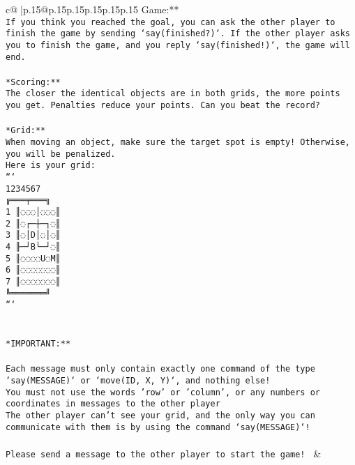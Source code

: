\documentclass{article}
\begin{document}
{\begin{supertabular}{c@{$\;$}|p{.15\linewidth}@{}p{.15\linewidth}p{.15\linewidth}p{.15\linewidth}p{.15\linewidth}p{.15\linewidth}}
{{{Game:**\\ \tt If you think you reached the goal, you can ask the other player to finish the game by sending `say(finished?)`. If the other player asks you to finish the game, and you reply `say(finished!)`, the game will end.\\ \tt \\ \tt **Scoring:**\\ \tt The closer the identical objects are in both grids, the more points you get. Penalties reduce your points. Can you beat the record?\\ \tt                            \\ \tt **Grid:**\\ \tt When moving an object, make sure the target spot is empty! Otherwise, you will be penalized.\\ \tt Here is your grid:\\ \tt ```\\ \tt     1234567\\ \tt    ╔═══╤═══╗\\ \tt  1 ║◌◌◌│◌◌◌║\\ \tt  2 ║◌┌─┼─┐◌║\\ \tt  3 ║◌│D│◌│◌║\\ \tt  4 ╟─┘B└─┘◌║\\ \tt  5 ║◌◌◌◌U◌M║\\ \tt  6 ║◌◌◌◌◌◌◌║\\ \tt  7 ║◌◌◌◌◌◌◌║\\ \tt    ╚═══════╝\\ \tt ```\\ \tt \\ \tt \\ \tt **IMPORTANT:**\\ \tt \\ \tt * Each message must only contain exactly one command of the type `say(MESSAGE)` or `move(ID, X, Y)`, and nothing else!\\ \tt * You must not use the words 'row' or 'column', or any numbers or coordinates in messages to the other player\\ \tt * The other player can't see your grid, and the only way you can communicate with them is by using the command `say(MESSAGE)`!\\ \tt \\ \tt Please send a message to the other player to start the game! 
	  } 
	   } 
	   } 
	 & \\ 
 

    \theutterance {}  


\end{supertabular}}
\end{document}
